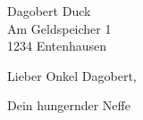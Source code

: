 \documentclass[12pt,ngerman]{scrlttr2}
\begin{document}
\begin{letter}{Dagobert Duck \\ Am Geldspeicher 1 \\ 1234 Entenhausen}
\opening{Lieber Onkel Dagobert,}

\closing{Dein hungernder Neffe}
\end{letter}
\end{document}
